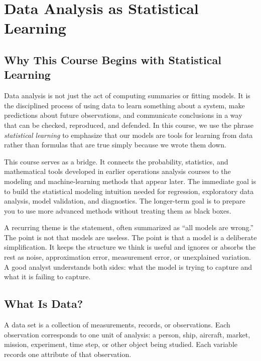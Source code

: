 \chapter{Data Analysis as Statistical Learning}
\label{chap:data-analysis-statistical-learning}

\section{Why This Course Begins with Statistical Learning}

Data analysis is not just the act of computing summaries or fitting models.  It is the disciplined process of using data to learn something about a system, make predictions about future observations, and communicate conclusions in a way that can be checked, reproduced, and defended.  In this course, we use the phrase \emph{statistical learning} to emphasize that our models are tools for learning from data rather than formulas that are true simply because we wrote them down.

This course serves as a bridge.  It connects the probability, statistics, and mathematical tools developed in earlier operations analysis courses to the modeling and machine-learning methods that appear later.  The immediate goal is to build the statistical modeling intuition needed for regression, exploratory data analysis, model validation, and diagnostics.  The longer-term goal is to prepare you to use more advanced methods without treating them as black boxes.

A recurring theme is the statement, often summarized as ``all models are wrong.''  The point is not that models are useless.  The point is that a model is a deliberate simplification.  It keeps the structure we think is useful and ignores or absorbs the rest as noise, approximation error, measurement error, or unexplained variation.  A good analyst understands both sides: what the model is trying to capture and what it is failing to capture.

\section{What Is Data?}

A data set is a collection of measurements, records, or observations.  Each observation corresponds to one unit of analysis: a person, ship, aircraft, market, mission, experiment, time step, or other object being studied.  Each variable records one attribute of that observation.

